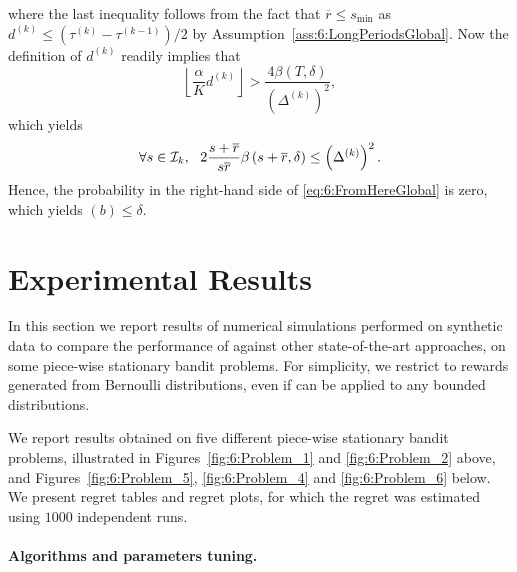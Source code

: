 %
where the last inequality follows from the fact that $\overline{r} \leq s_{\min}$ as $d^{(k)} \leq (\tau^{(k)} - \tau^{(k-1)})/2$ by Assumption~\ref{ass:6:LongPeriodsGlobal}. Now the definition of $d^{(k)}$ readily implies that
\[\left\lfloor \frac{\alpha}{K}d^{(k)}\right\rfloor > \frac{4\beta(T,\delta)}{\left(\Delta^{(k)}\right)^2},\]
which yields
\[\forall s \in \cI_k, \ \ 2\frac{s+\overline{r}}{s\overline{r}}\beta\left(s+\overline{r}, \delta\right) \leq \left(\Delta^{(k)}\right)^2.\]
%
Hence, the probability in the right-hand side of \eqref{eq:6:FromHereGlobal} is zero, which yields $(b) \leq \delta$.





\section{Experimental Results}
\label{sec:6:NumericalExperiments}

In this section we report results of numerical simulations performed on synthetic data to compare the performance of \GLRklUCB{} against other state-of-the-art approaches, on some piece-wise stationary bandit problems.
%
For simplicity, we restrict to rewards generated from Bernoulli distributions, even if \GLRklUCB{} can be applied to any bounded distributions.


We report results obtained on five different piece-wise stationary bandit problems, illustrated in Figures~\ref{fig:6:Problem_1} and \ref{fig:6:Problem_2} above, and Figures~\ref{fig:6:Problem_5}, \ref{fig:6:Problem_4} and \ref{fig:6:Problem_6} below.
We present regret tables and regret plots,
for which the regret was estimated using $1000$ independent runs.


\paragraph{Algorithms and parameters tuning.}
\label{sub:6:ParametersTuning}

